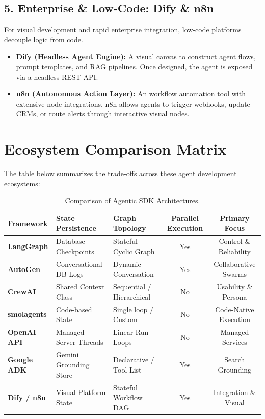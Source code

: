 \subsection{5. Enterprise \& Low-Code: Dify \& n8n}
For visual development and rapid enterprise integration, low-code platforms decouple logic from code.
\begin{itemize}
    \item \textbf{Dify (Headless Agent Engine):} A visual canvas to construct agent flows, prompt templates, and RAG pipelines. Once designed, the agent is exposed via a headless REST API.
    \item \textbf{n8n (Autonomous Action Layer):} An workflow automation tool with extensive node integrations. n8n allows agents to trigger webhooks, update CRMs, or route alerts through interactive visual nodes.
\end{itemize}

\section{Ecosystem Comparison Matrix}

The table below summarizes the trade-offs across these agent development ecosystems:

\begin{table}[h!]
\centering
\small
\begin{tabular}{|l|p{3.2cm}|p{3.2cm}|c|c|}
\hline
\textbf{Framework} & \textbf{State Persistence} & \textbf{Graph Topology} & \textbf{Parallel Execution} & \textbf{Primary Focus} \\ \hline
\textbf{LangGraph} & Database Checkpoints & Stateful Cyclic Graph & Yes & Control \& Reliability \\ \hline
\textbf{AutoGen} & Conversational DB Logs & Dynamic Conversation & Yes & Collaborative Swarms \\ \hline
\textbf{CrewAI} & Shared Context Class & Sequential / Hierarchical & No & Usability \& Persona \\ \hline
\textbf{smolagents} & Code-based State & Single loop / Custom & No & Code-Native Execution \\ \hline
\textbf{OpenAI API} & Managed Server Threads & Linear Run Loops & No & Managed Services \\ \hline
\textbf{Google ADK} & Gemini Grounding Store & Declarative / Tool List & Yes & Search Grounding \\ \hline
\textbf{Dify / n8n} & Visual Platform State & Stateful Workflow DAG & Yes & Integration \& Visual \\ \hline
\end{tabular}
\caption{Comparison of Agentic SDK Architectures.}
\end{table}

